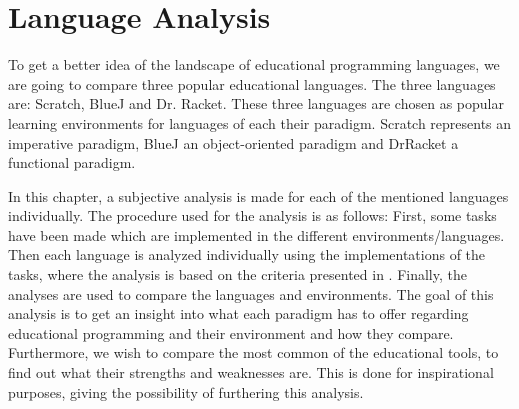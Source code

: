 \chapter{Language Analysis}
\label{chap:language_analysis}
To get a better idea of the landscape of educational programming languages, we are going to compare three popular educational languages.
The three languages are: Scratch, BlueJ and Dr. Racket.
These three languages are chosen as popular learning environments for languages of each their paradigm.
Scratch represents an imperative paradigm, BlueJ an object-oriented paradigm and DrRacket a functional paradigm.

In this chapter, a subjective analysis is made for each of the mentioned languages individually. The procedure used for the analysis is as follows: First, some tasks have been made which are implemented in the different environments/languages. Then each language is analyzed individually using the implementations of the tasks, where the analysis is based on the criteria presented in . Finally, the analyses are used to compare the languages and environments. The goal of this analysis is to get an insight into what each paradigm has to offer regarding educational programming and their environment and how they compare. Furthermore, we wish to compare the most common of the educational tools, to find out what their strengths and weaknesses are. This is done for inspirational purposes, giving the possibility of furthering this analysis.

